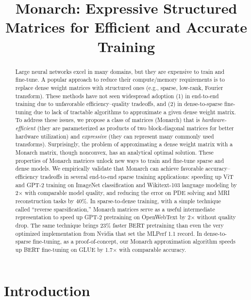 \title{Monarch: Expressive Structured Matrices for Efficient and Accurate Training}

\begin{abstract}
Large neural networks excel in many domains, but they are expensive to train and fine-tune. A popular approach to reduce their compute/memory requirements is to replace dense weight matrices with structured ones (e.g., sparse, low-rank, Fourier transform). These methods have not seen widespread adoption (1) in end-to-end training due to unfavorable efficiency--quality tradeoffs, and (2) in dense-to-sparse fine-tuning due to lack of tractable algorithms to approximate a given dense weight matrix. To address these issues, we propose a class of matrices (Monarch) that is \emph{hardware-efficient} (they are parameterized as products of two block-diagonal matrices for better hardware utilization) and \emph{expressive} (they can represent many commonly used transforms). Surprisingly, the problem of approximating a dense weight matrix with a Monarch matrix, though nonconvex, has an analytical optimal solution. These properties of Monarch matrices unlock new ways to train and fine-tune sparse and dense models. We empirically validate that Monarch can achieve favorable accuracy–efficiency tradeoffs in several end-to-end sparse training applications: speeding up ViT and GPT-2 training on ImageNet classification and Wikitext-103 language modeling by 2$\times$ with comparable model quality, and reducing the error on PDE solving and MRI reconstruction tasks by 40\%.
  In sparse-to-dense training, with a simple technique called ``reverse sparsification,'' Monarch matrices serve as a useful intermediate representation to speed up GPT-2 pretraining on OpenWebText by 2$\times$ without quality drop. The same technique brings 23\% faster BERT pretraining than even the very optimized implementation from Nvidia that set the MLPerf 1.1 record. In dense-to-sparse fine-tuning, as a proof-of-concept, our Monarch approximation algorithm speeds up BERT fine-tuning on GLUE by 1.7$\times$ with comparable accuracy.
\end{abstract}

\section{Introduction}
\label{sec:intro}

